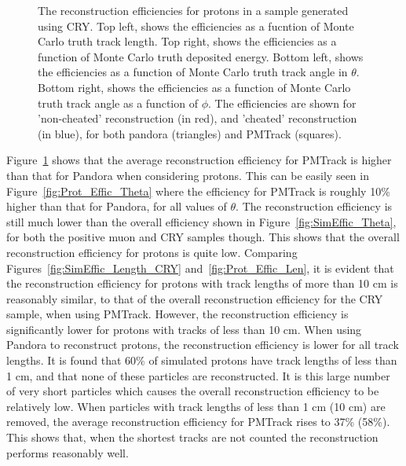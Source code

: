 \begin{figure}[h!]
  \caption[The reconstruction efficiencies for protons in a sample generated using CRY.]
          {The reconstruction efficiencies for protons in a sample generated using CRY. Top left, shows the efficiencies as a fucntion of Monte Carlo truth track length. Top right, shows the efficiencies as a function of Monte Carlo truth deposited energy. Bottom left, shows the efficiencies as a function of Monte Carlo truth track angle in $\theta$. Bottom right, shows the efficiencies as a function of Monte Carlo truth track angle as a function of $\phi$. The efficiencies are shown for 'non-cheated' reconstruction (in red), and 'cheated' reconstruction (in blue), for both pandora (triangles) and PMTrack (squares).}
  \label{fig:Prot_Effic}
\end{figure}

Figure~\ref{fig:Prot_Effic} shows that the average reconstruction efficiency for PMTrack is higher than that for Pandora when considering protons. This can be easily seen in Figure~\ref{fig:Prot_Effic_Theta} where the efficiency for PMTrack is roughly 10\% higher than that for Pandora, for all values of $\theta$. The reconstruction efficiency is still much lower than the overall efficiency shown in Figure~\ref{fig:SimEffic_Theta}, for both the positive muon and CRY samples though. This shows that the overall reconstruction efficiency for protons is quite low. Comparing Figures~\ref{fig:SimEffic_Length_CRY} and~\ref{fig:Prot_Effic_Len}, it is evident that the reconstruction efficiency for protons with track lengths of more than 10 cm is reasonably similar, to that of the overall reconstruction efficiency for the CRY sample, when using PMTrack. However, the reconstruction efficiency is significantly lower for protons with tracks of less than 10 cm. When using Pandora to reconstruct protons, the reconstruction efficiency is lower for all track lengths. It is found that 60\% of simulated protons have track lengths of less than 1 cm, and that none of these particles are reconstructed. It is this large number of very short particles which causes the overall reconstruction efficiency to be relatively low. When particles with track lengths of less than 1 cm (10 cm) are removed, the average reconstruction efficiency for PMTrack rises to 37\% (58\%). This shows that, when the shortest tracks are not counted the reconstruction performs reasonably well. \\

